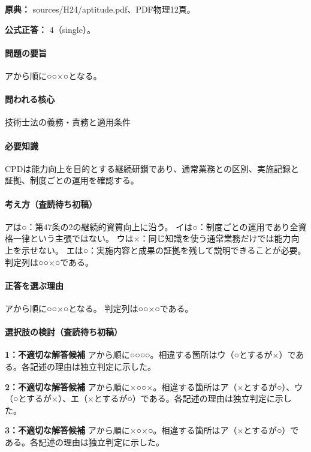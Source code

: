 \noindent\textbf{原典：} sources/H24/aptitude.pdf、PDF物理12頁。

\textbf{公式正答：} 4（single）。

\paragraph{問題の要旨} アから順に○○×○となる。

\paragraph{問われる核心} 技術士法の義務・責務と適用条件

\paragraph{必要知識} CPDは能力向上を目的とする継続研鑚であり、通常業務との区別、実施記録と証拠、制度ごとの運用を確認する。

\paragraph{考え方（査読待ち初稿）} アは○：第47条の2の継続的資質向上に沿う。 イは○：制度ごとの運用であり全資格一律という主張ではない。 ウは×：同じ知識を使う通常業務だけでは能力向上を示せない。 エは○：実施内容と成果の証拠を残して説明できることが必要。 判定列は○○×○である。

\paragraph{正答を選ぶ理由} アから順に○○×○となる。  判定列は○○×○である。

\paragraph{選択肢の検討（査読待ち初稿）}

\noindent\textbf{1：不適切な解答候補} アから順に○○○○。相違する箇所はウ（○とするが×）である。各記述の理由は独立判定に示した。\par

\noindent\textbf{2：不適切な解答候補} アから順に×○○×。相違する箇所はア（×とするが○）、ウ（○とするが×）、エ（×とするが○）である。各記述の理由は独立判定に示した。\par

\noindent\textbf{3：不適切な解答候補} アから順に×○×○。相違する箇所はア（×とするが○）である。各記述の理由は独立判定に示した。\par

